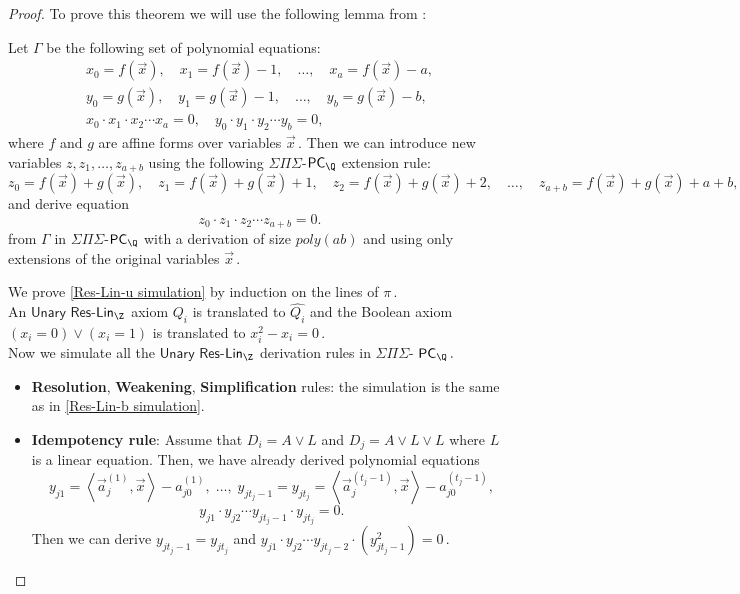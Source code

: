 \documentclass{toc}
\begin{document}
\begin{proof}
To prove this theorem we will use the following lemma from \cite{IMP19_new}:
\begin{lemma}\label{lem:unary sum}
%
%
Let $\Gamma$ be the following set of polynomial equations: %
%
%
%
%
%
%
%
%
%
\begin{align*}
x_0 = f(\vec x), \quad x_1 = f(\vec x) - 1, \quad \ldots, \quad x_a = f(\vec x) - a, \\
y_0 = g(\vec x), \quad y_1 = g(\vec x) - 1, \quad \ldots, \quad y_b = g(\vec x) - b, \\
x_0 \cdot x_1 \cdot x_2 \cdots x_a = 0, \quad y_0 \cdot y_1 \cdot y_2 \cdots y_b = 0,
\end{align*}
%
where $f$ and $g$ are affine forms over variables %
$\vec x\,.$ %
%
Then we can introduce new variables $z, z_1, \ldots, z_{a + b}$ using the following $\Sigma \Pi \Sigma$-$\mathsf{PC}_{\Q}$ extension rule:
$$
z_0 = f(\vec x) + g(\vec x), \quad z_1 = f(\vec x) + g(\vec x) + 1, \quad  z_2 = f(\vec x) + g(\vec x) + 2 , \quad \ldots, \quad z_{a + b} = f(\vec x) + g(\vec x) + a + b,
$$
and derive equation
$$
z_0 \cdot z_1 \cdot z_2 \cdots z_{a + b} = 0.
$$
from $\Gamma$ in $\Sigma \Pi \Sigma$-$\mathsf{PC}_{\Q}$ with a derivation of size $poly(a b)$ and using only extensions of the original variables %
$\vec x\,.$ %


\end{lemma}

We prove \autoref{Res-Lin-u simulation} by induction on the lines of %
$\pi\,.$ %
\mbox{}\\  An $\mathsf{Unary}$ $\mathsf{Res}$-$\mathsf{Lin}_\Z$ axiom $Q_i$ is translated to $\widehat{Q_i}$ and the Boolean axiom $(x_i = 0) \vee (x_i = 1)$ is translated to  %
$x_i^2 - x_i = 0\,.$ %
\mbox{}\\  Now we simulate all the $\mathsf{Unary}$ $\mathsf{Res}$-$\mathsf{Lin}_\Z$ derivation rules in $\Sigma \Pi \Sigma$-%
$\mathsf{PC}_{\Q}\,.$ %
\begin{itemize}
    \item \textbf{Resolution}, \textbf{Weakening}, \textbf{Simplification} rules: the simulation is the same as in \autoref{Res-Lin-b simulation}.
    \item \textbf{Idempotency rule}: Assume that $D_i = A \vee L$ and $D_j = A \vee L \vee L$ where $L$ is a linear equation. 
    Then, we have already derived polynomial equations 
    $$
    y_{j 1} = \left\langle \vec a_j^{(1)}, \vec x \right \rangle - a_{j 0}^{(1)}, \; \ldots, \; y_{j t_{j} - 1} = y_{j t_j} = \left\langle \vec a_j^{(t_j - 1)}, \vec x \right \rangle - a_{j 0}^{(t_j - 1)},
    $$
    $$
    y_{j 1} \cdot y_{j 2} \cdots y_{j t_j - 1} \cdot y_{j t_j} = 0.
    $$
    Then we can derive $y_{j t_j - 1} = y_{j t_j}$ and %
$y_{j 1} \cdot y_{j 2} \cdots y_{j t_j - 2} \cdot (y_{j t_j - 1}^2) = 0\,.$ %


\end{itemize}
\end{proof}
\end{document}
